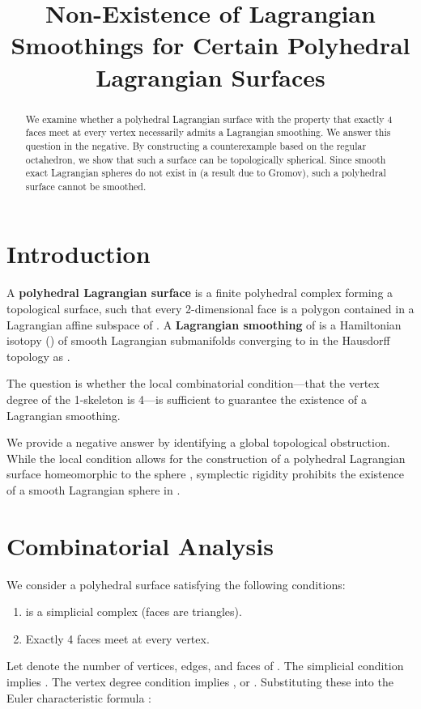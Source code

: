 \documentclass[12pt]{article}
\theoremstyle{plain}
\theoremstyle{definition}
\begin{document}
\title{Non-Existence of Lagrangian Smoothings for Certain Polyhedral Lagrangian Surfaces}
\date{}
\maketitle

\begin{abstract}
We examine whether a polyhedral Lagrangian surface  with the property that exactly 4 faces meet at every vertex necessarily admits a Lagrangian smoothing. We answer this question in the negative. By constructing a counterexample based on the regular octahedron, we show that such a surface can be topologically spherical. Since smooth exact Lagrangian spheres do not exist in  (a result due to Gromov), such a polyhedral surface cannot be smoothed.
\end{abstract}

\section{Introduction}

A \textbf{polyhedral Lagrangian surface}  is a finite polyhedral complex forming a topological surface, such that every 2-dimensional face is a polygon contained in a Lagrangian affine subspace of . A \textbf{Lagrangian smoothing} of  is a Hamiltonian isotopy  () of smooth Lagrangian submanifolds converging to  in the Hausdorff topology as .

The question is whether the local combinatorial condition---that the vertex degree of the 1-skeleton is 4---is sufficient to guarantee the existence of a Lagrangian smoothing.

We provide a negative answer by identifying a global topological obstruction. While the local condition allows for the construction of a polyhedral Lagrangian surface homeomorphic to the sphere , symplectic rigidity prohibits the existence of a smooth Lagrangian sphere in .

\section{Combinatorial Analysis}

We consider a polyhedral surface  satisfying the following conditions:
\begin{enumerate}
\item  is a simplicial complex (faces are triangles).
\item Exactly 4 faces meet at every vertex.
\end{enumerate}
Let  denote the number of vertices, edges, and faces of . The simplicial condition implies . The vertex degree condition implies , or .
Substituting these into the Euler characteristic formula :
\end{document}
